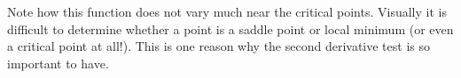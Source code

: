 \documentclass{ximera}
\begin{document}
\begin{example}
\begin{explanation}
\begin{image}
    \end{image}
    Note how this function does not vary much near the critical
    points. Visually it is difficult to determine whether a point is a
    saddle point or local minimum (or even a critical point at
    all!). This is one reason why the second derivative test is so
    important to have.
  \end{explanation}
\end{example}
\end{document}
